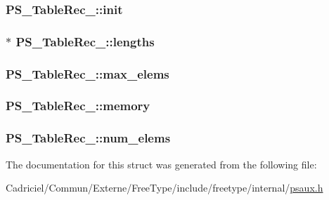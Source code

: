 \hypertarget{struct_p_s___table_rec___aa76fb2bcdcf4fc75e880b092bb9d3115}{
\subsubsection[{init}]{ P\-S\-\_\-\-Table\-Rec\-\_\-\-::init}}\label{struct_p_s___table_rec___aa76fb2bcdcf4fc75e880b092bb9d3115}
\hypertarget{struct_p_s___table_rec___a955ae6315b89923f1074f3d046da23b1}{
\subsubsection[{lengths}]{$\ast$ P\-S\-\_\-\-Table\-Rec\-\_\-\-::lengths}}\label{struct_p_s___table_rec___a955ae6315b89923f1074f3d046da23b1}
\hypertarget{struct_p_s___table_rec___a8594ec199ad792ed7ffd558806a7d23b}{
\subsubsection[{max\-\_\-elems}]{ P\-S\-\_\-\-Table\-Rec\-\_\-\-::max\-\_\-elems}}\label{struct_p_s___table_rec___a8594ec199ad792ed7ffd558806a7d23b}
\hypertarget{struct_p_s___table_rec___a061872add9c6d1af67cfdfac5ce2b80d}{
\subsubsection[{memory}]{ P\-S\-\_\-\-Table\-Rec\-\_\-\-::memory}}\label{struct_p_s___table_rec___a061872add9c6d1af67cfdfac5ce2b80d}
\hypertarget{struct_p_s___table_rec___a26706016251497b19039f2c002c4e9d5}{
\subsubsection[{num\-\_\-elems}]{ P\-S\-\_\-\-Table\-Rec\-\_\-\-::num\-\_\-elems}}\label{struct_p_s___table_rec___a26706016251497b19039f2c002c4e9d5}


The documentation for this struct was generated from the following file\-:\begin{DoxyCompactItemize}
\item 
Cadriciel/\-Commun/\-Externe/\-Free\-Type/include/freetype/internal/\hyperlink{psaux_8h}{psaux.\-h}\end{DoxyCompactItemize}
